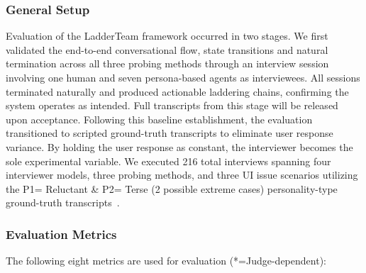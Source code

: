 \documentclass[sigconf,authordraft]{acmart}
\begin{document}
\subsubsection{General Setup}
Evaluation of the LadderTeam framework occurred in two stages. We first validated the end-to-end conversational flow, state transitions and natural termination across all three probing methods through an interview session involving one human and seven persona-based agents as interviewees. All sessions terminated naturally and produced actionable laddering chains, confirming the system operates as intended. Full transcripts from this stage will be released upon acceptance. Following this baseline establishment, the evaluation transitioned to scripted ground-truth transcripts to eliminate user response variance. By holding the user response as constant, the interviewer becomes the sole experimental variable. We executed 216 total interviews spanning four interviewer models, three probing methods, and three UI issue scenarios utilizing the P1= Reluctant \& P2= Terse (2 possible extreme cases) personality-type ground-truth transcripts~\cite{costa_neo_2014}. 

\subsubsection{Evaluation Metrics}
The following eight metrics are used for evaluation (*=Judge-dependent):
\end{document}
